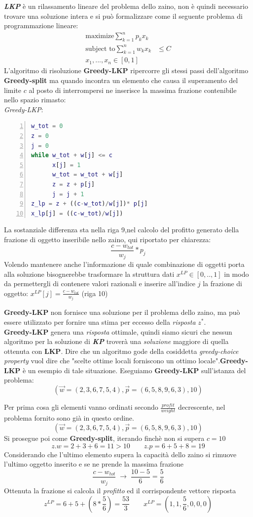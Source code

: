 \documentclass[a4paper]{article}
\newcommand{\imp}[1]{\textbf{\textit{#1}}}
\begin{document}
\imp{LKP} è un rilassamento lineare del problema dello zaino, non è quindi necessario trovare una soluzione intera e si può formalizzare come il seguente problema di programmazione lineare:
\begin{align*}
	\text{maximize} \sum_{k=1}^n p_kx_k&\\
	\text{subject to} \sum_{k=1}^n w_kx_k& \leq C\\
	x_1,...,x_n \in [0,1]&
\end{align*}
L'algoritmo di risoluzione \textbf{Greedy-LKP} ripercorre gli stessi passi dell'algoritmo \textbf{Greedy-split} ma quando incontra un elemento che causa il superamento del limite $c$ al posto di interrompersi ne inserisce la massima frazione contenibile nello spazio rimasto:\\
\textit{Greedy-LKP}:
\begin{lstlisting}[numbers=left,firstnumber=1,language=Matlab, stepnumber=1, xleftmargin=15pt]
w_tot = 0
z = 0
j = 0
while w_tot + w[j] <= c
      x[j] = 1
      w_tot = w_tot + w[j]
      z = z + p[j]
      j = j + 1
z_lp = z + ((c-w_tot)/w[j])* p[j]  
x_lp[j] = ((c-w_tot)/w[j]) 
\end{lstlisting}
La sostanziale differenza sta nella riga 9,nel calcolo del profitto generato della frazione di oggetto inseribile nello zaino, qui riportato per chiarezza: $$\frac{c - w_{tot}}{w_j}*p_j$$
Volendo mantenere anche l'informazione di quale combinazione di oggetti porta alla soluzione bisognerebbe trasformare la struttura dati $x^{LP} \in [0,..,1]$ in modo da permettergli di contenere valori razionali e inserire all'indice $j$ la frazione di oggetto: $x^{LP}[j]=\frac{c - w_{tot}}{w_j}$ (riga 10)

\textbf{Greedy-LKP} non fornisce una soluzione per il problema dello zaino, ma può essere utilizzato per fornire una stima per eccesso della \emph{risposta} $z^*$.\\
\textbf{Greedy-LKP} genera una \emph{risposta} ottimale, quindi siamo sicuri che nessun algoritmo per la soluzione di \imp{KP} troverà una \textit{soluzione} maggiore di quella ottenuta con \textbf{LKP}.
Dire che un algoritmo gode della cosiddetta \textit{greedy-choice property} vuol dire che "scelte ottime locali forniscono un ottimo locale".\textbf{Greedy-LKP} è un esempio di tale situazione.
Eseguiamo \textbf{Greedy-LKP} sull'istanza del problema: $$(\vec w = (2, 3, 6, 7, 5, 4), \vec p = (6, 5, 8, 9, 6, 3), 10)$$
\begin{adjustwidth}{.8cm}{0cm}
	Per prima cosa gli elementi vanno ordinati secondo $\frac{profit}{weight}$ decrescente, nel problema fornito sono già in questo ordine. 
	$$(\vec w = (2, 3, 6, 7, 5, 4), \vec p = (6, 5, 8, 9, 6, 3), 10)$$
	Si prosegue poi come \textbf{Greedy-split}, iterando finchè non si supera $c=10$
	$$ z.w = 2 + 3 + 6 = 11 > 10 \qquad z.p= 6 + 5 + 8 = 19$$
	Considerando che l'ultimo elemento supera la capacità dello zaino si rimuove l'ultimo oggetto inserito e se ne prende la massima frazione
	$$ \frac{c - w_{tot}}{w_j} \; \rightarrow \; \frac{10 - 5}{6} = \frac{5}{6}$$
	Ottenuta la frazione si calcola il \textit{profitto} ed il corrispondente vettore risposta
	$$ z^{LP}= 6 + 5 + (8 * \frac{5}{6} ) = \frac{53}{3} \qquad x^{LP} = (1,1,\frac{5}{6},0,0,0) $$
\end{adjustwidth}
\end{document}
